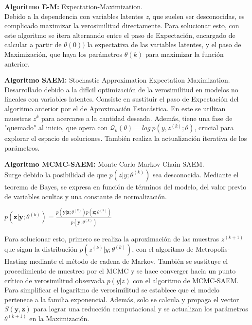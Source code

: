 \documentclass[12pt]{article}
\begin{document}
\begin{description}
	\item {\textbf{Algoritmo E-M: }}Expectation-Maximization.\\
	Debido a la dependencia con variables latentes \textit{z}, que suelen ser desconocidas, es complicado maximizar la verosimilitud directamente. Para solucionar esto, con este algoritmo se itera alternando entre el paso de Expectación, encargado de calcular a partir de $\theta(0))$  la expectativa de las variables latentes, y el paso de Maximización, que haya los parámetros $\theta(k)$ para maximizar la función anterior.
	
	\item {\textbf{Algoritmo SAEM: }}Stochastic Approximation Expectation Maximization.\\
	Desarrollado debido a la difícil optimización de la verosimilitud en modelos no lineales con variables latentes. Consiste en sustituir el paso de Expectación del algoritmo anterior por el de Aproximación Estocástica. En este se utilizan muestras $z^{k}$ para acercarse a la cantidad deseada. Además, tiene una fase de "quemado" al inicio, que opera con $\mathcal{Q}_{k}(\theta)=log\ p(y,z^{(k)};\theta)$, crucial para explorar el espacio de soluciones. También realiza la actualización iterativa de los parámetros.
	
	\item {\textbf{Algoritmo MCMC-SAEM: }}Monte Carlo Markov Chain SAEM.\\
	Surge debido la posibilidad de que $p(z|y;\theta^{(k)})$ sea desconocida. Mediante el teorema de Bayes, se expresa en función de términos del modelo, del valor previo de variables ocultas y una constante de normalización.
	\begin{center}
		$p(\mathbf{z}|\mathbf{y};\theta^{(k)})=\frac{p(\mathbf{y}|\mathbf{z};\theta^{(k)})p(\mathbf{z};\theta^{(k)})}{p(\mathbf{y};\theta^{(k)})}$
	\end{center}
	Para solucionar esto, primero se realiza la aproximación de las muestras $z^{(k+1)}$  que sigan la distribución $p(z^{(k)}|y;\theta^{(k)})$, con el algoritmo de Metropolis-Hasting mediante el método de cadena de Markov. También se sustituye el procedimiento de muestreo por el MCMC y se hace converger hacia un punto crítico de verosimilitud observada $p(y|z)$ con el algoritmo de MCMC-SAEM. Para simplificar el logaritmo de verosimilitud se establece que el modelo pertenece a la familia exponencial. Además, solo se calcula y propaga el vector $\mathit{S}(\mathbf{y},\mathbf{z})$ para lograr una reducción computacional y se actualizan los parámetros $\theta^{(k+1)}$ en la Maximización.
	

\end{description}
\end{document}
